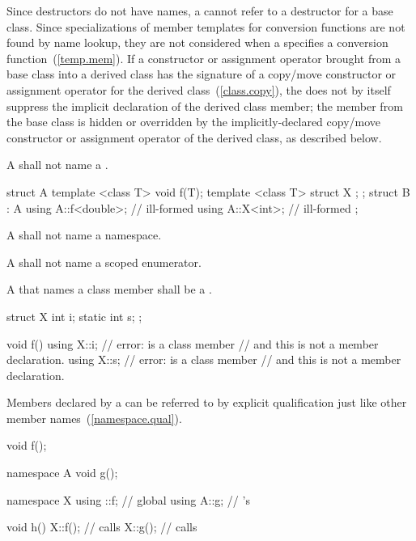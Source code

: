 \pnum
\enternote
Since destructors do not have names, a
 cannot refer to a
destructor for a base class. Since specializations of member templates
for conversion functions are not found by name lookup, they are not
considered when a  specifies a conversion
function~(\ref{temp.mem}).
\exitnote
If a constructor or assignment operator brought from a base class into a derived class
has the signature of a copy/move constructor or assignment operator
for the derived class~(\ref{class.copy}),
the  does not by itself
suppress the implicit declaration of the derived class member;
the member from the base class is hidden or overridden
by the implicitly-declared copy/move constructor or assignment operator
of the derived class, as described below.

\pnum
A  shall not name a .
\enterexample

\begin{codeblock}
struct A {
  template <class T> void f(T);
  template <class T> struct X { };
};
struct B : A {
  using A::f<double>;           // ill-formed
  using A::X<int>;              // ill-formed
};
\end{codeblock}
\exitexample

\pnum
A  shall not name a namespace.

\pnum
A  shall not name a scoped enumerator.

\pnum
A  that names a class member shall be a
.
\enterexample

\begin{codeblock}
struct X {
  int i;
  static int s;
};

void f() {
  using X::i;       // error:  is a class member
                    // and this is not a member declaration.
  using X::s;       // error:  is a class member
                    // and this is not a member declaration.
}
\end{codeblock}
\exitexample

\pnum
Members declared by a  can be referred to by
explicit qualification just like other member
names~(\ref{namespace.qual}).
\enterexample

\begin{codeblock}
void f();

namespace A {
  void g();
}

namespace X {
  using ::f;        // global 
  using A::g;       // 's 
}

void h()
{
  X::f();           // calls 
  X::g();           // calls 
}
\end{codeblock}
\exitexample

